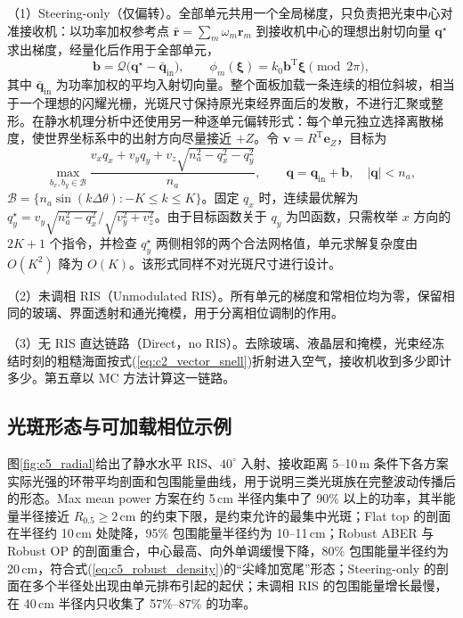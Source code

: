 （1）Steering-only（仅偏转）。全部单元共用一个全局梯度，只负责把光束中心对准接收机：以功率加权参考点 $\bar{\mathbf r}=\sum_m\omega_m\mathbf r_m$ 到接收机中心的理想出射切向量 $\mathbf q^\star$ 求出梯度，经量化后作用于全部单元，
\begin{equation}
\mathbf b=\mathcal Q\big(\mathbf q^\star-\bar{\mathbf q}_{\mathrm{in}}\big),\qquad
\phi_m(\boldsymbol\xi)=k_0\mathbf b^{\mathrm T}\boldsymbol\xi\pmod{2\pi},
\label{eq:c3_steer_global}
\end{equation}
其中 $\bar{\mathbf q}_{\mathrm{in}}$ 为功率加权的平均入射切向量。整个面板加载一条连续的相位斜坡，相当于一个理想的闪耀光栅，光斑尺寸保持原光束经界面后的发散，不进行汇聚或整形。在静水机理分析中还使用另一种逐单元偏转形式：每个单元独立选择离散梯度，使世界坐标系中的出射方向尽量接近 $+Z$。令 $\mathbf v=R^{\mathrm T}\mathbf e_Z$，目标为
\begin{equation}
\max_{b_x,b_y\in\mathcal B}\frac{v_xq_x+v_yq_y+v_z\sqrt{n_a^2-q_x^2-q_y^2}}{n_a},\qquad
\mathbf q=\mathbf q_{\mathrm{in}}+\mathbf b,\quad |\mathbf q|<n_a,
\label{eq:c5_steer}
\end{equation}
$\mathcal B=\{n_a\sin(k\Delta\theta):-K\le k\le K\}$。固定 $q_x$ 时，连续最优解为 $q_y^\star=v_y\sqrt{n_a^2-q_x^2}/\sqrt{v_y^2+v_z^2}$。由于目标函数关于 $q_y$ 为凹函数，只需枚举 $x$ 方向的 $2K+1$ 个指令，并检查 $q_y^\star$ 两侧相邻的两个合法网格值，单元求解复杂度由 $O(K^2)$ 降为 $O(K)$。该形式同样不对光斑尺寸进行设计。

（2）未调相 RIS（Unmodulated RIS）。所有单元的梯度和常相位均为零，保留相同的玻璃、界面透射和通光掩模，用于分离相位调制的作用。

（3）无 RIS 直达链路（Direct，no RIS）。去除玻璃、液晶层和掩模，光束经冻结时刻的粗糙海面按式(\ref{eq:c2_vector_snell})折射进入空气，接收机收到多少即计多少。第五章以 MC 方法计算这一链路。

\subsection{光斑形态与可加载相位示例}

图\ref{fig:c5_radial}给出了静水水平 RIS、$40^\circ$ 入射、接收距离 5--10\,m 条件下各方案实际光强的环带平均剖面和包围能量曲线，用于说明三类光斑族在完整波动传播后的形态。Max mean power 方案在约 5\,cm 半径内集中了 90\% 以上的功率，其半能量半径接近 $R_{0.5}\ge2\,\mathrm{cm}$ 的约束下限，是约束允许的最集中光斑；Flat top 的剖面在半径约 10\,cm 处陡降，95\% 包围能量半径约为 10--11\,cm；Robust ABER 与 Robust OP 的剖面重合，中心最高、向外单调缓慢下降，80\% 包围能量半径约为 20\,cm，符合式(\ref{eq:c5_robust_density})的“尖峰加宽尾”形态；Steering-only 的剖面在多个半径处出现由单元排布引起的起伏；未调相 RIS 的包围能量增长最慢，在 40\,cm 半径内只收集了 57\%--87\% 的功率。

